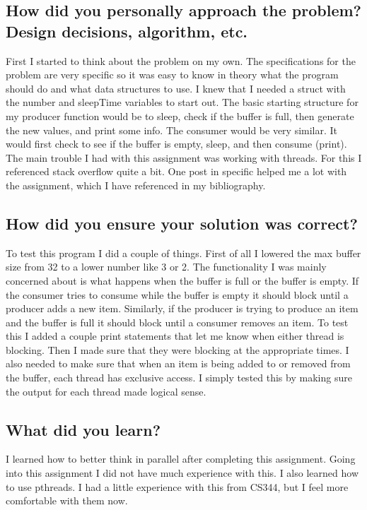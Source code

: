 \documentclass[letterpaper,10pt,titlepage,draftclsnofoot,onecolumn]{IEEEtran}
\begin{document}
\subsection{How did you personally approach the problem? Design decisions, algorithm, etc.}
First I started to think about the problem on my own. The specifications for the problem are very specific so it was easy to know in theory what the program should do and what data structures to use. I knew that I needed a struct with the number and sleepTime variables to start out. The basic starting structure for my producer function would be to sleep, check if the buffer is full, then generate the new values, and print some info. The consumer would be very similar. It would first check to see if the buffer is empty, sleep, and then consume (print). The main trouble I had with this assignment was working with threads. For this I referenced stack overflow quite a bit. One post in specific helped me a lot with the assignment, which I have referenced in my bibliography. \cite{stack}
\subsection{How did you ensure your solution was correct?}
To test this program I did a couple of things. First of all I lowered the max buffer size from 32 to a lower number like 3 or 2. The functionality I was mainly concerned about is what happens when the buffer is full or the buffer is empty. If the consumer tries to consume while the buffer is empty it should block until a producer adds a new item. Similarly, if the producer is trying to produce an item and the buffer is full it should block until a consumer removes an item. To test this I added a couple print statements that let me know when either thread is blocking. Then I made sure that they were blocking at the appropriate times.
I also needed to make sure that when an item is being added to or removed from the buffer, each thread has exclusive access. I simply tested this by making sure the output for each thread made logical sense.
\subsection{What did you learn?}
I learned how to better think in parallel after completing this assignment. Going into this assignment I did not have much experience with this. I also learned how to use pthreads. I had a little experience with this from CS344, but I feel more comfortable with them now. 
\end{document}
